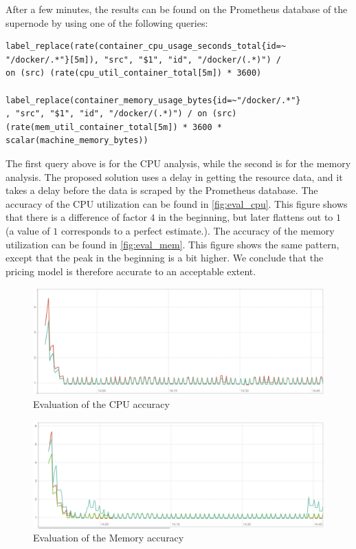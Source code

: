 \noindent
After a few minutes, the results can be found on the Prometheus database of the supernode by using one of the following queries:

\begin{verbatim}
label_replace(rate(container_cpu_usage_seconds_total{id=~
"/docker/.*"}[5m]), "src", "$1", "id", "/docker/(.*)") / 
on (src) (rate(cpu_util_container_total[5m]) * 3600)

label_replace(container_memory_usage_bytes{id=~"/docker/.*"}
, "src", "$1", "id", "/docker/(.*)") / on (src)
(rate(mem_util_container_total[5m]) * 3600 * 
scalar(machine_memory_bytes))
\end{verbatim}

\noindent
The first query above is for the CPU analysis, while the second is for the memory analysis. The proposed solution uses a delay in getting the resource data, and it takes a delay before the data is scraped by the Prometheus database. The accuracy of the CPU utilization can be found in \autoref{fig:eval_cpu}. This figure shows that there is a difference of factor $4$ in the beginning, but later flattens out to $1$ (a value of $1$ corresponds to a perfect estimate.). The accuracy of the memory utilization can be found in \autoref{fig:eval_mem}. This figure shows the same pattern, except that the peak in the beginning is a bit higher. We conclude that the pricing model is therefore accurate to an acceptable extent.

\begin{figure}
    \centering
    \includegraphics[width=\textwidth]{gfx/eval_cpu}
    \caption{Evaluation of the CPU accuracy}
    \label{fig:eval_cpu}
\end{figure}

\begin{figure}
    \centering
    \includegraphics[width=\textwidth]{gfx/eval_mem}
    \caption{Evaluation of the Memory accuracy}
    \label{fig:eval_mem}
\end{figure}

